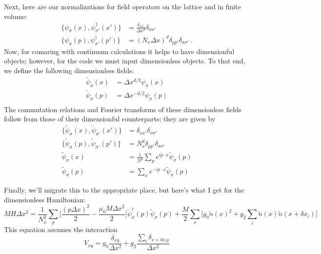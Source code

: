 Next, here are our normalizations for field operators on the lattice and in finite volume:
\begin{align}
\{ \psi_{\sigma}(x) , \psi^{\dagger}_{\sigma'}(x') \} & = \frac{\delta_{x x'}}{\Delta x^d} \delta_{\sigma \sigma'} \\
\{ \psi_{\sigma}(p) , \psi^{\dagger}_{\sigma'}(p') \} & = (N_x \Delta x)^d \delta_{p p'}\delta_{\sigma \sigma'} ~.
\end{align} 
Now, for comaring with continuum calculations it helps to have dimensionful objects; however, for the code we must input
dimensionless objects. To that end, we define the following dimensionless fields:
\begin{align}
\tilde{\psi}_{\sigma}(x) & = \Delta x^{d/2} \psi_{\sigma}(x) \\
\tilde{\psi}_{\sigma}(p) & = \Delta x^{-d/2} \psi_{\sigma}(p) \\
\end{align}
The commutation relations and Fourier transforms of these dimensionless fields follow from those of their dimensionful counterparts; they are given by
\begin{align}
\{\tilde{\psi}_{\sigma}(x),\tilde{\psi}_{\sigma'}(x')\} & = \delta_{x x'} \delta_{\sigma \sigma'} \\
\{\tilde{\psi}_{\sigma}(p),\tilde{\psi}_{\sigma'}(p')\} & = N_x^d \delta_{p p'} \delta_{\sigma \sigma'} \\
\tilde{\psi}_{\sigma}(x) & = \frac{1}{N^d} \sum_p e^{i p \cdot x} \tilde{\psi}_{\sigma}(p) \\
\tilde{\psi}_{\sigma}(p) & =  \sum_x e^{-i p \cdot x} \tilde{\psi}_{\sigma}(p) 
\end{align}

Finally, we'll migrate this to the appropriate place, but here's what I get for the dimensionless Hamiltonian:
\begin{equation}
M H \Delta x^2 = \frac{1}{N_x^2} \sum_p \Bigg[ \frac{(p \Delta x)^2}{2} - \frac{\mu_0 M \Delta x^2}{2} \Bigg] \tilde{\psi}^{\dagger}_{\sigma}(p) \tilde{\psi}_{\sigma}(p) + \frac{M}{2} \sum_x \Bigg[g_0 \tilde{n}(x)^2 + g_2 \sum_i \tilde{n}(x) \tilde{n}(x+\delta x_i) \Bigg]
\end{equation}
This equation assumes the interaction
\begin{equation}
V_{x y} = g_0 \frac{\delta_{xy}}{\Delta x^2} + g_2 \frac{\sum_i \delta_{x+\delta x_i y}}{\Delta x^2}
\end{equation}



